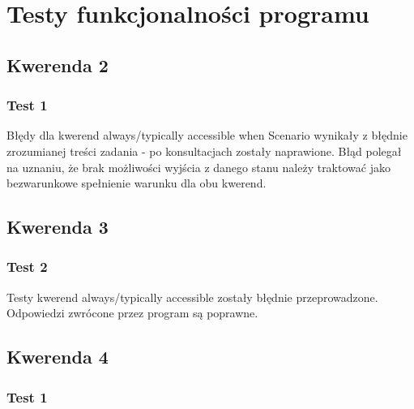 \documentclass{article}
\begin{document}
\section{Testy funkcjonalności programu}
\subsection{Kwerenda 2}
\subsubsection{Test 1}
Błędy dla kwerend always/typically accessible when Scenario wynikały z błędnie zrozumianej treści zadania - po konsultacjach zostały naprawione. Błąd polegał na uznaniu, że brak możliwości wyjścia z danego stanu należy traktować jako bezwarunkowe spełnienie warunku dla obu kwerend.

\subsection{Kwerenda 3}
\subsubsection{Test 2}

Testy kwerend always/typically accessible zostały błędnie przeprowadzone. Odpowiedzi zwrócone przez program są poprawne.

\subsection{Kwerenda 4}
\subsubsection{Test 1}
\end{document}

